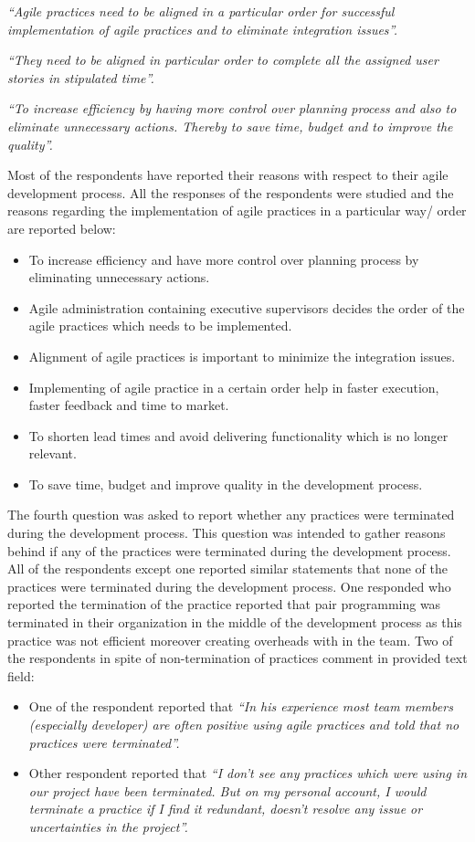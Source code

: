 \documentclass[a4paper,oneside]{bth}
\begin{document}
\textit{“Agile practices need to be aligned in a particular order for successful implementation of agile practices and to eliminate integration issues”.}

\textit{“They need to be aligned in particular order to complete all the assigned user stories in stipulated time”.}

\textit{“To increase efficiency by having more control over planning process and also to eliminate unnecessary actions. Thereby to save time, budget and to improve the quality”.}

 Most of the respondents have reported their reasons with respect to their agile development process. All the responses of the respondents were studied and the reasons regarding the implementation of agile practices in a particular way/ order are reported below:
 \begin{itemize}
\item To increase efficiency and have more control over planning process by eliminating unnecessary actions.
\item	Agile administration containing executive supervisors decides the order of the agile practices which needs to be implemented.
\item	Alignment of agile practices is important to minimize the integration issues.
\item	Implementing of agile practice in a certain order help in faster execution, faster feedback and time to market.
\item	To shorten lead times and avoid delivering functionality which is no longer relevant.
\item	To save time, budget and improve quality in the development process.
\end{itemize}

The fourth question was asked to report whether any practices were terminated during the development process. This question was intended to gather reasons behind if any of the practices were terminated during the development process. All of the respondents except one reported similar statements that none of the practices were terminated during the development process. One responded who reported the termination of the practice reported that pair programming was terminated in their organization in the middle of the development process as this practice was not efficient moreover creating overheads with in the team.  Two of the respondents in spite of non-termination of practices comment in provided text field:
\begin{itemize}
\item One of the respondent reported that \textit{“In his experience most team members (especially developer) are often positive using agile practices and told that no practices were terminated”.}
\item Other respondent reported that \textit{“I don’t see any practices which were using in our project have been terminated. But on my personal account, I would terminate a practice if I find it redundant, doesn’t resolve any issue or uncertainties in the project”.}
\end{itemize}
\end{document}
